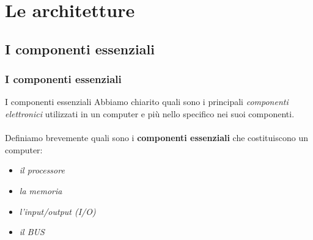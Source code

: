 \section[Le architetture]{Le architetture}
\label{sec:architectures}


\subsection[I componenti essenziali]{I componenti essenziali}
\begin{frame}
	\frametitle{I componenti essenziali}
	
	\begin{block}{I componenti essenziali}
		Abbiamo chiarito quali sono i principali \textit{componenti elettronici} utilizzati in un computer e più nello specifico nei suoi componenti.\\~\\
		Definiamo brevemente quali sono i \textbf{componenti essenziali} che costituiscono un computer:
		\begin{itemize}
			\item \textit{il processore}
			\item \textit{la memoria}
			\item \textit{l'input/output (I/O)}
			\item \textit{il BUS}
		\end{itemize}
		
	\end{block}
	
\end{frame}



%	
%	
%	



